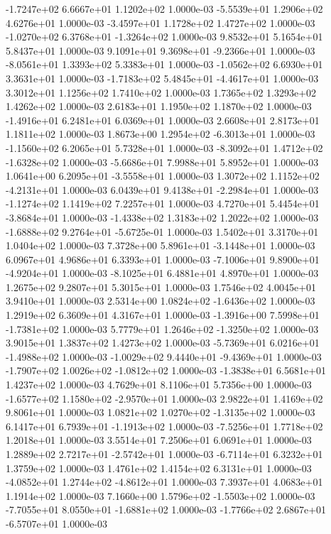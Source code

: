-1.7247e+02  6.6667e+01  1.1202e+02  1.0000e-03
-5.5539e+01  1.2906e+02  4.6276e+01  1.0000e-03
-3.4597e+01  1.1728e+02  1.4727e+02  1.0000e-03
-1.0270e+02  6.3768e+01 -1.3264e+02  1.0000e-03
9.8532e+01 5.1654e+01 5.8437e+01  1.0000e-03
 9.1091e+01  9.3698e+01 -9.2366e+01  1.0000e-03
-8.0561e+01  1.3393e+02  5.3383e+01  1.0000e-03
-1.0562e+02  6.6930e+01  3.3631e+01  1.0000e-03
-1.7183e+02  5.4845e+01 -4.4617e+01  1.0000e-03
3.3012e+01 1.1256e+02 1.7410e+02  1.0000e-03
1.7365e+02 1.3293e+02 1.4262e+02  1.0000e-03
2.6183e+01 1.1950e+02 1.1870e+02  1.0000e-03
-1.4916e+01  6.2481e+01  6.0369e+01  1.0000e-03
2.6608e+01 2.8173e+01 1.1811e+02  1.0000e-03
 1.8673e+00  1.2954e+02 -6.3013e+01  1.0000e-03
-1.1560e+02  6.2065e+01  5.7328e+01  1.0000e-03
-8.3092e+01  1.4712e+02 -1.6328e+02  1.0000e-03
-5.6686e+01  7.9988e+01  5.8952e+01  1.0000e-03
 1.0641e+00  6.2095e+01 -3.5558e+01  1.0000e-03
 1.3072e+02  1.1152e+02 -4.2131e+01  1.0000e-03
 6.0439e+01  9.4138e+01 -2.2984e+01  1.0000e-03
-1.1274e+02  1.1419e+02  7.2257e+01  1.0000e-03
 4.7270e+01  5.4454e+01 -3.8684e+01  1.0000e-03
-1.4338e+02  1.3183e+02  1.2022e+02  1.0000e-03
-1.6888e+02  9.2764e+01 -5.6725e-01  1.0000e-03
1.5402e+01 3.3170e+01 1.0404e+02  1.0000e-03
 7.3728e+00  5.8961e+01 -3.1448e+01  1.0000e-03
6.0967e+01 4.9686e+01 6.3393e+01  1.0000e-03
-7.1006e+01  9.8900e+01 -4.9204e+01  1.0000e-03
-8.1025e+01  6.4881e+01  4.8970e+01  1.0000e-03
1.2675e+02 9.2807e+01 5.3015e+01  1.0000e-03
1.7546e+02 4.0045e+01 3.9410e+01  1.0000e-03
 2.5314e+00  1.0824e+02 -1.6436e+02  1.0000e-03
1.2919e+02 6.3609e+01 4.3167e+01  1.0000e-03
-1.3916e+00  7.5998e+01 -1.7381e+02  1.0000e-03
 5.7779e+01  1.2646e+02 -1.3250e+02  1.0000e-03
3.9015e+01 1.3837e+02 1.4273e+02  1.0000e-03
-5.7369e+01  6.0216e+01 -1.4988e+02  1.0000e-03
-1.0029e+02  9.4440e+01 -9.4369e+01  1.0000e-03
-1.7907e+02  1.0026e+02 -1.0812e+02  1.0000e-03
-1.3838e+01  6.5681e+01  1.4237e+02  1.0000e-03
4.7629e+01 8.1106e+01 5.7356e+00  1.0000e-03
-1.6577e+02  1.1580e+02 -2.9570e+01  1.0000e-03
2.9822e+01 1.4169e+02 9.8061e+01  1.0000e-03
 1.0821e+02  1.0270e+02 -1.3135e+02  1.0000e-03
 6.1417e+01  6.7939e+01 -1.1913e+02  1.0000e-03
-7.5256e+01  1.7718e+02  1.2018e+01  1.0000e-03
3.5514e+01 7.2506e+01 6.0691e+01  1.0000e-03
 1.2889e+02  2.7217e+01 -2.5742e+01  1.0000e-03
-6.7114e+01  6.3232e+01  1.3759e+02  1.0000e-03
1.4761e+02 1.4154e+02 6.3131e+01  1.0000e-03
-4.0852e+01  1.2744e+02 -4.8612e+01  1.0000e-03
7.3937e+01 4.0683e+01 1.1914e+02  1.0000e-03
 7.1660e+00  1.5796e+02 -1.5503e+02  1.0000e-03
-7.7055e+01  8.0550e+01 -1.6881e+02  1.0000e-03
-1.7766e+02  2.6867e+01 -6.5707e+01  1.0000e-03
